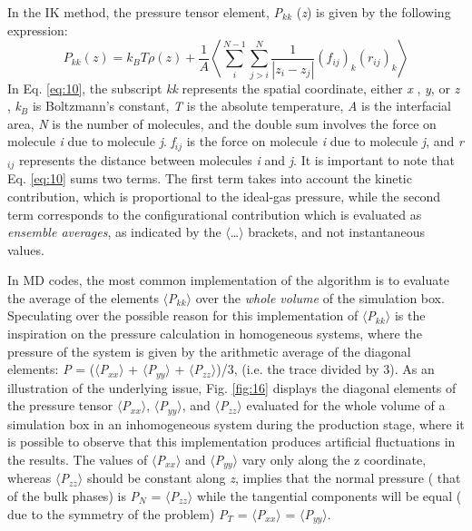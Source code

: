 \documentclass[9pt,bestpractices]{livecoms}
\begin{document}
In the IK method, the pressure tensor element, \textit{P}$_{kk}$ (\textit{z}) is given by the following expression:
\begin{equation}
P_{kk}\left(z\right)=k_{B}T\rho\left(z\right)+\frac{1}{A}\left\langle \sum_{{\scriptstyle i}}^{{\scriptstyle N-1}}\sum_{{\scriptstyle j>i}}^{N}\frac{1}{\left|z_{i}-z_{j}\right|}\left(f_{ij}\right)_{k}\left(r_{ij}\right)_{k}\right\rangle 
  \label{eq:10}
\end{equation}
In Eq. \ref{eq:10}, the subscript \textit{kk} represents the spatial coordinate, either
\textit{x} , \textit{y}, or \textit{z} , \textit{k}$_{B}$ is Boltzmann's
constant, \textit{T} is the absolute temperature, \textit{A} is the interfacial
area, \textit{N} is the number of molecules, and the double sum involves the
force on molecule \textit{i} due to molecule \textit{j}. \textit{f}$_{ij}$ is
the force on molecule \textit{i} due to molecule \textit{j}, and
\textit{r}$_{ij}$ represents the distance between molecules \textit{i} and
\textit{j}. It is important to note that Eq. \ref{eq:10} sums two terms.
The first term takes into account the kinetic contribution, which is
proportional to the ideal-gas pressure, while the second term corresponds to
the configurational contribution which is evaluated as \textit{ensemble averages}, as
indicated by the ${\langle}${\ldots}${\rangle}$ brackets, and not instantaneous
values.

In MD codes, the most common implementation of the algorithm is to evaluate the
average of the elements ${\langle}$\textit{P}$_{kk}$${\rangle}$ over the \textit{whole
volume} of the simulation box. Speculating over the possible reason for this
implementation of ${\langle}$\textit{P}$_{kk}$${\rangle}$ is the inspiration on
the pressure calculation in homogeneous systems, where the pressure of the
system is given by the arithmetic average of the diagonal elements: \textit{P}
= (${\langle}$\textit{P}$_{xx}$${\rangle}$
+ ${\langle}$\textit{P}$_{yy}$${\rangle}$
+ ${\langle}$\textit{P}$_{zz}$${\rangle}$)/3, (i.e. the trace divided by 3). As an illustration of the
underlying issue, Fig. \ref{fig:16} displays the diagonal elements of the pressure
tensor ${\langle}$\textit{P}$_{xx}$${\rangle}$,
${\langle}$\textit{P}$_{yy}$${\rangle}$, and
${\langle}$\textit{P}$_{zz}$${\rangle}$ evaluated for the whole volume of
a simulation box in an inhomogeneous system during the production stage, where
it is possible to observe that this implementation produces artificial
fluctuations in the results.  The values of
${\langle}$\textit{P}$_{xx}$${\rangle}$ and
${\langle}$\textit{P}$_{yy}$${\rangle}$ vary only along the z coordinate,
whereas ${\langle}$\textit{P}$_{zz}$${\rangle}$ should be constant along
\textit{z},  implies that the normal pressure ( that of the bulk phases) is
\textit{P}$_{N}$ = ${\langle}$\textit{P}$_{zz}$${\rangle}$ while the tangential
components will be equal ( due to the symmetry of the problem)
\textit{P}$_{T}$ = ${\langle}$\textit{P}$_{xx}$${\rangle}$
= ${\langle}$\textit{P}$_{yy}$${\rangle}$. 
\end{document}

